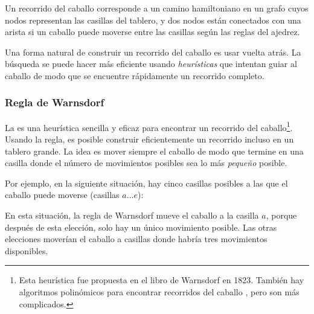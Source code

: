 \begin{center}
\end{center}

Un recorrido del caballo corresponde a un camino hamiltoniano en un grafo
cuyos nodos representan las casillas del tablero,
y dos nodos están conectados con una arista si un caballo
puede moverse entre las casillas según las reglas del ajedrez.

Una forma natural de construir un recorrido del caballo es usar vuelta atrás.
La búsqueda se puede hacer más eficiente usando
\emph{heurísticas} que intentan guiar al caballo de modo que
se encuentre rápidamente un recorrido completo.

\subsubsection{Regla de Warnsdorf}


La  es una heurística sencilla y eficaz
para encontrar un recorrido del caballo\footnote{Esta heurística fue propuesta
en el libro de Warnsdorf \cite{war23} en 1823. También hay
algoritmos polinómicos para encontrar recorridos del caballo
\cite{par97}, pero son más complicados.}.
Usando la regla, es posible construir eficientemente un recorrido
incluso en un tablero grande.
La idea es mover siempre el caballo de modo que termine
en una casilla donde el número de movimientos posibles sea lo más
\emph{pequeño} posible.

Por ejemplo, en la siguiente situación, hay cinco
casillas posibles a las que el caballo puede moverse (casillas $a \ldots e$):
\begin{center}
\end{center}
En esta situación, la regla de Warnsdorf mueve el caballo a la casilla $a$,
porque después de esta elección, solo hay un único movimiento posible.
Las otras elecciones moverían el caballo a casillas donde
habría tres movimientos disponibles.

